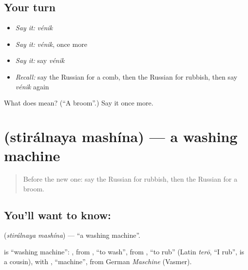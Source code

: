 \subsection*{Your turn}
\begin{itemize}
\raggedright
  \item \emph{Say it:} \emph{vénik}
  \item \emph{Say it:} \emph{vénik}, once more
  \item \emph{Say it:} say \emph{vénik}
  \item \emph{Recall:} say the Russian for a comb, then the Russian for rubbish, then say \emph{vénik} again
\end{itemize}

\begin{tcolorbox}[breakable,colback=teal!4,colframe=teal!35!black,title={Before you move on}]
What does  mean? (\textquotedblleft{}A broom\textquotedblright{}.) Say it once more.
\end{tcolorbox}
\section[\texorpdfstring{\ru{стиральная} \ru{машина} (stirálnaya mashína)}{стиральная машина (stirálnaya mashína)}]{  (stirálnaya mashína) — a washing machine}

\label{lesson:RU-C97-washing-machine}



\begin{quote}
Before the new one: say the Russian for rubbish, then the Russian for a broom.
\end{quote}

\subsection*{You'll want to know:  }
\textbf{ } (\emph{stirálnaya mashína}) — \textquotedblleft{}a washing machine\textquotedblright{}.

\begin{cousinweb}
\textbf{ } is \textquotedblleft{}washing machine\textquotedblright{}: \emph{}, from \emph{}, \textquotedblleft{}to wash\textquotedblright{}, from \emph{}, \textquotedblleft{}to rub\textquotedblright{} (Latin \emph{terō}, \textquotedblleft{}I rub\textquotedblright{}, is a cousin), with \emph{}, \textquotedblleft{}machine\textquotedblright{}, from German \emph{Maschine} (Vasmer).
\end{cousinweb}

